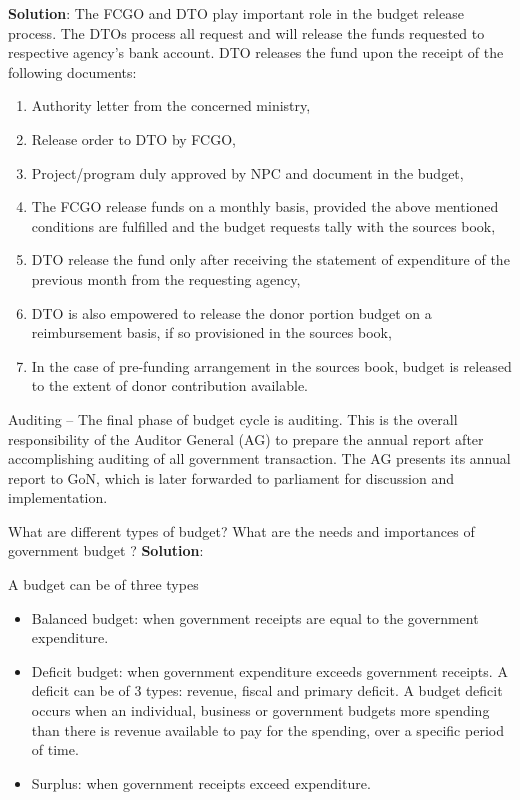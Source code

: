 \documentclass[
]{book}
\newcommand{\question}{\item}
\newenvironment{solution}{ {\bfseries Solution}:}{}
\begin{document}
\begin{questions}
\begin{solution}
The FCGO and DTO play important role in the budget release process. The DTOs process all request and will release the funds requested to respective agency's bank account. DTO releases the fund upon the receipt of the following documents:

\begin{enumerate}
\item Authority letter from the concerned ministry,
\item Release order to DTO by FCGO,
\item Project/program duly approved by NPC and document in the budget,
\item The FCGO release funds on a monthly basis, provided the above mentioned conditions are fulfilled and the budget requests tally with the sources book,
\item DTO release the fund only after receiving the statement of expenditure of the previous month from the requesting agency,
\item DTO is also empowered to release the donor portion budget on a reimbursement basis, if so provisioned in the sources book,
\item In the case of pre-funding arrangement in the sources book, budget is released to the extent of donor contribution available.
\end{enumerate}

Auditing -- The final phase of budget cycle is auditing. This is the overall responsibility of the Auditor General (AG) to prepare the annual report after accomplishing auditing of all government transaction. The AG presents its annual report to GoN, which is later forwarded to parliament for discussion and implementation.

\end{solution}

\question What are different types of budget? What are the needs and importances of government budget ?
\begin{solution}

A budget can be of three types
\begin{itemize}
\item Balanced budget: when government receipts are equal to the government expenditure.
\item Deficit budget: when government expenditure exceeds government receipts. A deficit can be of 3 types: revenue, fiscal and primary deficit. A budget deficit occurs when an individual, business or government budgets more spending than there is revenue available to pay for the spending, over a specific period of time.
\item Surplus: when government receipts exceed expenditure.
\end{itemize}


\end{solution}
\end{questions}
\end{document}

